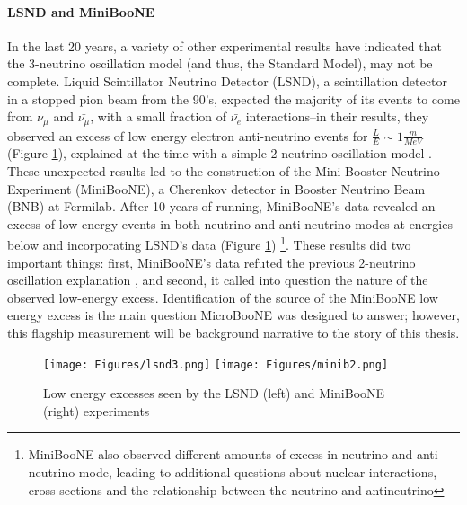 \documentclass[12pt]{article}
\begin{document}
\paragraph{LSND and MiniBooNE}
In the last 20 years, a variety of other experimental results have indicated that the 3-neutrino oscillation model (and thus, the Standard Model), may not be complete. Liquid Scintillator Neutrino Detector (LSND), a scintillation detector in a stopped pion beam from the 90's, expected the majority of its events to come from $\nu_\mu$ and $\bar{\nu_\mu}$, with a small fraction of $\bar{\nu_e}$ interactions--in their results, they observed an excess of low energy electron anti-neutrino events for $\frac{L}{E} \sim 1 \frac{m}{MeV}$ (Figure \ref{fig:lsnd}), explained at the time with a simple 2-neutrino oscillation model \cite{lsnd}. These unexpected results led to the construction of the Mini Booster Neutrino Experiment (MiniBooNE), a Cherenkov detector in Booster Neutrino Beam (BNB) at Fermilab. After 10 years of running, MiniBooNE's data revealed an excess of low energy events in both neutrino and anti-neutrino modes at energies below and incorporating LSND's data (Figure \ref{fig:lsnd}) \footnote{ MiniBooNE also observed different amounts of excess in neutrino and anti-neutrino mode, leading to additional questions about nuclear interactions, cross sections and the relationship between the neutrino and antineutrino\cite{miniboone}}.  These results did two important things: first, MiniBooNE's data refuted the previous 2-neutrino oscillation explanation \cite{miniboone}, and second, it called into question the nature of the observed low-energy excess. Identification of the source of the MiniBooNE low energy excess is the main question MicroBooNE was designed to answer; however, this flagship measurement will be background narrative to the story of this thesis. 
\begin{figure}[h!]
\centering
\texttt{[image: Figures/lsnd3.png]}
\hspace{1.5 cm}
\texttt{[image: Figures/minib2.png]}
\caption{Low energy excesses seen by the LSND (left) and MiniBooNE (right) experiments}
\label{fig:lsnd}
\end{figure}
\end{document}

